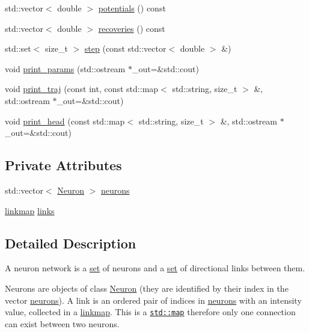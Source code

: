 \begin{DoxyCompactItemize}
std\+::vector$<$ double $>$ \hyperlink{classNetwork_a44d9c341bfec26cb37efe3c29fd7a103}{potentials} () const
\item 
std\+::vector$<$ double $>$ \hyperlink{classNetwork_a2e9dbb815c622cccdd50186ae8c9f4a7}{recoveries} () const
\item 
std\+::set$<$ size\+\_\+t $>$ \hyperlink{classNetwork_a53665a3a69e6ec894c313d0ce3fb7f34}{step} (const std\+::vector$<$ double $>$ \&)
\item 
void \hyperlink{classNetwork_afc43116eb2429aeec0f3c6a54d252142}{print\+\_\+params} (std\+::ostream $\ast$\+\_\+out=\&std\+::cout)
\item 
void \hyperlink{classNetwork_ae460d31557bba058fdf66e4fe5feb801}{print\+\_\+traj} (const int, const std\+::map$<$ std\+::string, size\+\_\+t $>$ \&, std\+::ostream $\ast$\+\_\+out=\&std\+::cout)
\item 
void \hyperlink{classNetwork_ab572dd33cb91d9f0aae89c4477809d26}{print\+\_\+head} (const std\+::map$<$ std\+::string, size\+\_\+t $>$ \&, std\+::ostream $\ast$\+\_\+out=\&std\+::cout)
\end{DoxyCompactItemize}
\subsection*{Private Attributes}
\begin{DoxyCompactItemize}
\item 
std\+::vector$<$ \hyperlink{classNeuron}{Neuron} $>$ \hyperlink{classNetwork_a1b7832bc2c7b8855cdc3b2d6329eff9d}{neurons}
\item 
\hyperlink{network_8h_a889f48bcec09c9d72a03648e911c5ff5}{linkmap} \hyperlink{classNetwork_aef1609a9a6b865651417ce995b4575a8}{links}
\end{DoxyCompactItemize}


\subsection{Detailed Description}
A neuron network is a \hyperlink{classNetwork_a1b7832bc2c7b8855cdc3b2d6329eff9d}{set} of neurons and a \hyperlink{classNetwork_aef1609a9a6b865651417ce995b4575a8}{set} of directional links between them.

Neurons are objects of class \hyperlink{classNeuron}{Neuron} (they are identified by their index in the vector \hyperlink{classNetwork_a1b7832bc2c7b8855cdc3b2d6329eff9d}{neurons}). A link is an ordered pair of indices in \hyperlink{classNetwork_a1b7832bc2c7b8855cdc3b2d6329eff9d}{neurons} with an intensity value, collected in a \hyperlink{network_8h_a889f48bcec09c9d72a03648e911c5ff5}{linkmap}. This is a \href{https://en.cppreference.com/w/cpp/container/map}{\tt std\+::map} therefore only one connection can exist between two neurons.

